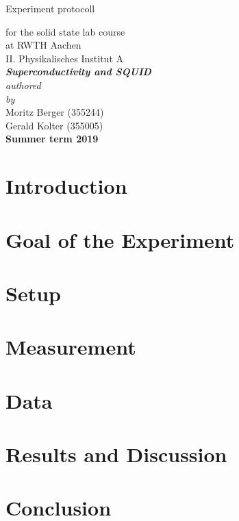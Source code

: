 \documentclass[12pt,a4paper]{article}
\author{Gerald}
\begin{document}
	\setlength{\parindent}{0pt} 
	\begin{center}
		{\LARGE Experiment protocoll}\\
		\begin{large}
			for the solid state lab course\\[0.4cm]
			at RWTH Aachen\\
			II. Physikalisches Institut A\\[5.5cm]
			\Large\textbf{\textsl{Superconductivity and SQUID}}\\[5.5cm]
			\normalsize\textit{authored\\by}\\[0.4cm]
			\large{Moritz Berger (355244)\\Gerald Kolter (355005)}\\[2cm]
			\large \textbf{Summer term 2019}
		\end{large}
	\end{center}
	\newpage
	
	\tableofcontents
	\newpage

\section{Introduction}
\section{Goal of the Experiment}
\section{Setup}
\section{Measurement}
\section{Data}
\section{Results and Discussion}
\section{Conclusion}


\end{document}
